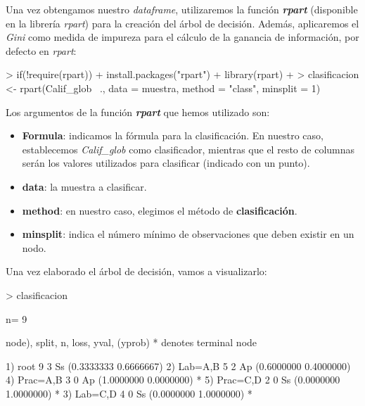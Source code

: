 \documentclass [a4paper] {article}
\begin{document}
Una vez obtengamos nuestro \textit{dataframe}, utilizaremos la función \textbf{\textit{rpart}} (disponible en la librería \textit{rpart}) 
para la creación del árbol de decisión. Además, aplicaremos el \textit{Gini} como medida de impureza para el cálculo de la ganancia de información,
por defecto en \textit{rpart}:
\newpage
\begin{Schunk}
\begin{Sinput}
> if(!require(rpart)){
+ 	install.packages("rpart")
+ 	library(rpart)
+ }
> clasificacion <- rpart(Calif_glob ~., data = muestra, method = "class", minsplit = 1)
\end{Sinput}
\end{Schunk}

Los argumentos de la función \textbf{\textit{rpart}} que hemos utilizado son:
\begin{itemize}
    \item \textbf{Formula}:  indicamos la fórmula para la clasificación. En nuestro caso, establecemos \textit{Calif\_glob} como clasificador,
		  mientras que el resto de columnas serán los valores utilizados para clasificar (indicado con un punto).
    \item \textbf{data}: la muestra a clasificar.
    \item \textbf{method}: en nuestro caso, elegimos el método de \textbf{clasificación}.
    \item \textbf{minsplit}: indica el número mínimo de observaciones que deben existir en un nodo.
\end{itemize}

Una vez elaborado el árbol de decisión, vamos a visualizarlo:
\begin{Schunk}
\begin{Sinput}
> clasificacion
\end{Sinput}
\begin{Soutput}
n= 9 

node), split, n, loss, yval, (yprob)
      * denotes terminal node

1) root 9 3 Ss (0.3333333 0.6666667)  
  2) Lab=A,B 5 2 Ap (0.6000000 0.4000000)  
    4) Prac=A,B 3 0 Ap (1.0000000 0.0000000) *
    5) Prac=C,D 2 0 Ss (0.0000000 1.0000000) *
  3) Lab=C,D 4 0 Ss (0.0000000 1.0000000) *
\end{Soutput}
\end{Schunk}
\end{document}
